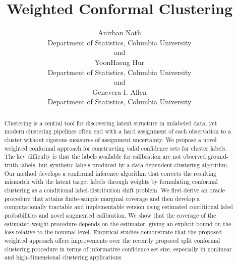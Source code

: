 \documentclass[11pt,letterpaper]{article}
\title{Weighted Conformal Clustering}
\author{Anirban Nath \\
    Department of Statistics, Columbia University\\
    and \\
    YoonHaeng Hur \\
    Department of Statistics, Columbia University\\
    and \\
    Genevera I. Allen \\
    Department of Statistics, Columbia University}
\theoremstyle{definition}
\begin{document}
\maketitle

\begin{abstract}
    Clustering is a central tool for discovering latent structure in unlabeled data; yet modern clustering pipelines often end with a hard assignment of each observation to a cluster without rigorous measures of assignment uncertainty. We propose a novel weighted conformal approach for constructing valid confidence sets for cluster labels. The key difficulty is that the labels available for calibration are not observed ground-truth labels, but synthetic labels produced by a data-dependent clustering algorithm. Our method develops a conformal inference algorithm that corrects the resulting mismatch with the latent target labels through weights by formulating conformal clustering as a conditional label-distribution shift problem. We first derive an oracle procedure that attains finite-sample marginal coverage and then develop a computationally tractable and implementable version using estimated conditional label probabilities and novel augmented calibration. We show that the coverage of the estimated-weight procedure depends on the estimator, giving an explicit bound on the loss relative to the nominal level. Empirical studies demonstrate that the proposed weighted approach offers improvements over the recently proposed split conformal clustering procedure in terms of informative confidence set size, especially in nonlinear and high-dimensional clustering applications.
\end{abstract}
\end{document}

